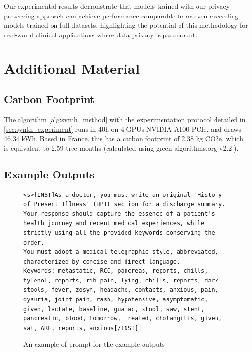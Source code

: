 Our experimental results demonstrate that models trained with our privacy-preserving approach can achieve performance comparable to or even exceeding models trained on full datasets, highlighting the potential of this methodology for real-world clinical applications where data privacy is paramount.

\section{Additional Material}

\subsection{Carbon Footprint}
The algorithm \ref{alg:synth_method} with the experimentation protocol detailed in \ref{sec:synth_experiment} runs in 40h on 4 GPUs NVIDIA A100 PCIe, and draws 46.34 kWh. Based in France, this has a carbon footprint of 2.38 kg CO2e, which is equivalent to 2.59 tree-months (calculated using green-algorithms.org v2.2 \cite{lannelongueGreenAlgorithmsQuantifying2021}).

\subsection{Example Outputs}

\begin{figure}[hbt]
    \centering
    \begin{Verbatim}[breaklines=true, frame=single]
    <s>[INST]As a doctor, you must write an original 'History of Present Illness' (HPI) section for a discharge summary.
Your response should capture the essence of a patient's health journey and recent medical experiences, while strictly using all the provided keywords conserving the order.
You must adopt a medical telegraphic style, abbreviated, characterized by concise and direct language.
Keywords: metastatic, RCC, pancreas, reports, chills, tylenol, reports, rib pain, lying, chills, reports, dark stools, fever, zosyn, headache, contacts, anxious, pain, dysuria, joint pain, rash, hypotensive, asymptomatic, given, lactate, baseline, guaiac, stool, saw, stent, pancreatic, blood, tomorrow, treated, cholangitis, given, sat, ARF, reports, anxious[/INST]
    \end{Verbatim}
    \caption{An example of prompt for the example outputs}
    \label{fig:synth_appendix_prompt}
\end{figure}

